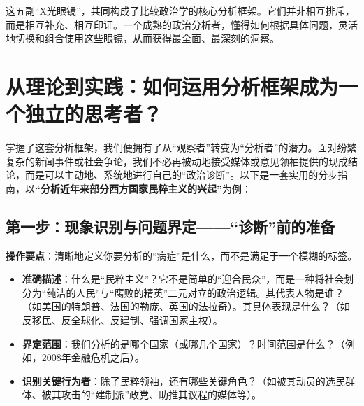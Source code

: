 这五副“X光眼镜”，共同构成了比较政治学的核心分析框架。它们并非相互排斥，而是相互补充、相互印证。一个成熟的政治分析者，懂得如何根据具体问题，灵活地切换和组合使用这些眼镜，从而获得最全面、最深刻的洞察。

\section{从理论到实践：如何运用分析框架成为一个独立的思考者？}

掌握了这套分析框架，我们便拥有了从“观察者”转变为“分析者”的潜力。面对纷繁复杂的新闻事件或社会争论，我们不必再被动地接受媒体或意见领袖提供的现成结论，而是可以主动地、系统地进行自己的“政治诊断”。以下是一套实用的分步指南，以\textbf{“分析近年来部分西方国家民粹主义的兴起”}为例：

\subsection{第一步：现象识别与问题界定——“诊断”前的准备}
\textbf{操作要点}：清晰地定义你要分析的“病症”是什么，而不是满足于一个模糊的标签。
\begin{itemize}
    \item \textbf{准确描述}：什么是“民粹主义”？它不是简单的“迎合民众”，而是一种将社会划分为“纯洁的人民”与“腐败的精英”二元对立的政治逻辑。其代表人物是谁？（如美国的特朗普、法国的勒庞、英国的法拉奇）。其具体表现是什么？（如反移民、反全球化、反建制、强调国家主权）。
    \item \textbf{界定范围}：我们分析的是哪个国家（或哪几个国家）？时间范围是什么？（例如，2008年金融危机之后）。
    \item \textbf{识别关键行为者}：除了民粹领袖，还有哪些关键角色？（如被其动员的选民群体、被其攻击的“建制派”政党、助推其议程的媒体等）。
\end{itemize}

